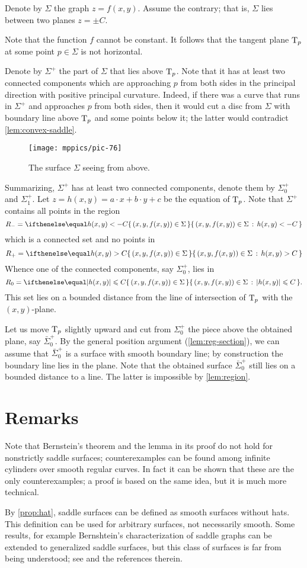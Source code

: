 Denote by $\Sigma$ the graph $z=f(x,y)$.
Assume the contrary; that is, $\Sigma$ lies between two planes $z=\pm C$.

Note that the function $f$ cannot be constant.
It follows that the tangent plane $\mathrm{T}_p$ at some point $p\in\Sigma$ is not horizontal.

Denote by $\Sigma^+$ the part of $\Sigma$ that lies above $\mathrm{T}_p$.
Note that it has at least two connected components which are approaching $p$ from both sides 
in the principal direction with positive principal curvature.
Indeed, if there was a curve that runs in $\Sigma^+$ and approaches $p$ from both sides, then it would cut a disc from $\Sigma$ with boundary line above $\mathrm{T}_p$ and some points below it;
the latter would contradict \ref{lem:convex-saddle}.

\begin{figure}[h!]
\vskip-0mm
\centering
\texttt{[image: mppics/pic-76]}
\caption*{The surface $\Sigma$ seeing from above.}
\vskip0mm
\end{figure}

Summarizing, $\Sigma^+$ has at least two connected components, denote them by $\Sigma^+_0$ and $\Sigma^+_1$.
Let $z=h(x,y)=a\cdot x+b\cdot y+c$ be the equation of $\mathrm{T}_p$.
Note that $\Sigma^+$ contains all points in the region
\[R_-=\set{(x,y,f(x,y))\in\Sigma}{h(x,y)< -C}\] 
which is a connected set and no points in 
\[R_+=\set{(x,y,f(x,y))\in\Sigma}{h(x,y)> C}\]
Whence one of the connected components, say $\Sigma^+_0$, lies in 
\[R_0=\set{(x,y,f(x,y))\in\Sigma}{|h(x,y)|\le  C}.\]
This set lies on a bounded distance from the line of intersection of $\mathrm{T}_p$ with the $(x,y)$-plane.

Let us move $\mathrm{T}_p$ slightly upward and cut from $\Sigma^+_0$ the piece above the obtained plane, say $\bar\Sigma^+_0$.
By the general position argument (\ref{lem:reg-section}),
we can assume that $\bar\Sigma^+_0$ is a surface with smooth boundary line;
by construction the boundary line lies in the plane.
Note that the obtained surface $\bar\Sigma^+_0$ still lies on a bounded distance to a line.
The latter is impossible by \ref{lem:region}.
\qeds

\section*{Remarks}

Note that Bernstein's theorem and the lemma in its proof do not hold for nonstrictly saddle surfaces;
counterexamples can be found among infinite cylinders over smooth regular curves.
In fact it can be shown that these are the only counterexamples;
a proof is based on the same idea, but it is much more technical.

By \ref{prop:hat}, saddle surfaces can be defined as smooth surfaces without hats.
This definition can be used for arbitrary surfaces, not necessarily smooth.
Some results, for example Bernshtein's characterization of saddle graphs can be extended to generalized saddle surfaces, but this class of surfaces is far from being understood; see \cite[Chapter 4]{alexander-kapovitch-petrunin2019} and the references therein.
